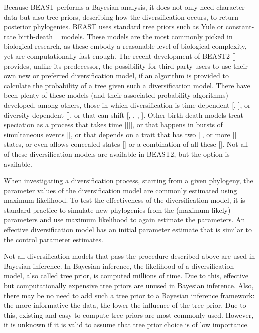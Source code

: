\documentclass{article}
\begin{document}
Because BEAST performs a Bayesian analysis, 
it does not only need character data but also tree priors, 
describing how the diversification occurs, to return posterior phylogenies.
BEAST uses standard tree priors such as Yule or 
constant-rate birth-death [\cite{nee1994reconstructed}] models.
These models are the most commonly picked in biological research,
as these embody a reasonable level of biological complexity, 
yet are computationally fast enough.
The recent development of BEAST2 [\cite{bouckaert2014beast}] provides, 
unlike its predecessor, the possibility for third-party users 
to use their own new or preferred diversification model, 
if an algorithm is provided to calculate the probability 
of a tree given such a diversification model.
There have been plenty of these models (and their associated probability algorithms) 
developed, among others, those in which diversification is 
time-dependent [\cite{nee1994reconstructed}, \cite{rabosky2008explosive}], 
or diversity-dependent [\cite{etienne2011diversity}],
or that can shift [\cite{etienne2012conceptual}, 
\cite{rabosky2014automatic}, \cite{alfaro2009nine}, \cite{laudanno2018sls}].
Other birth-death models treat speciation as a process that takes 
time [\cite{rosindell2010protracted}][\cite{etienne2012prolonging}], 
or that happens in bursts of simultaneous 
events [\cite{laudanno2018mbd}], or that
depends on a trait that has two [\cite{maddison2007estimating}], 
or more [\cite{fitzjohn2012diversitree}] states,
or even allows concealed states [\cite{beaulieu2016detecting}] 
or a combination of all these [\cite{herrera2018detecting}].
Not all of these diversification models are available in BEAST2, 
but the option is available.

When investigating a diversification process,
starting from a given phylogeny, 
the parameter values of the diversification model 
are commonly estimated using maximum likelihood.
To test the effectiveness of the diversification model,
it is standard practice to simulate new phylogenies
from the (maximum likely) parameters and use maximum
likelihood to again estimate the parameters.
An effective diversification model has an
initial parameter estimate that is similar to the control parameter estimates.

Not all diversification models that pass the procedure described above
are used in Bayesian inference.
In Bayesian inference, the likelihood of a diversification 
model, also called tree prior, is computed millions of time.
Due to this, effective but computationally expensive tree priors 
are unused in Bayesian inference.
Also, there may be no need to add such a tree prior to a Bayesian
inference framework: the more informative the data, 
the lower the influence of the tree prior.
Due to this, existing and easy to compute tree priors are most commonly used.
However, it is unknown if it is valid to assume that tree prior choice is 
of low importance.
\end{document}

